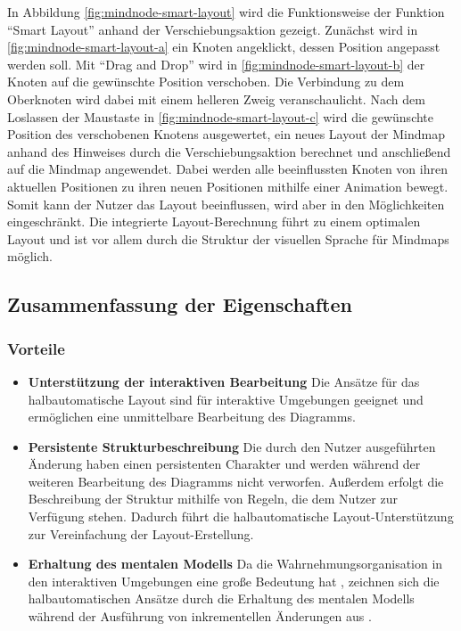 In Abbildung \ref{fig:mindnode-smart-layout} wird die Funktionsweise der Funktion \enquote{Smart Layout} anhand der Verschiebungsaktion gezeigt. Zunächst wird in \ref{fig:mindnode-smart-layout-a} ein Knoten angeklickt, dessen Position angepasst werden soll. Mit \enquote{Drag and Drop} wird in \ref{fig:mindnode-smart-layout-b} der Knoten auf die gewünschte Position verschoben. Die Verbindung zu dem Oberknoten wird dabei mit einem helleren Zweig veranschaulicht. Nach dem Loslassen der Maustaste in \ref{fig:mindnode-smart-layout-c} wird die gewünschte Position des verschobenen Knotens ausgewertet, ein neues Layout der Mindmap anhand des Hinweises durch die Verschiebungsaktion berechnet und anschließend auf die Mindmap angewendet. Dabei werden alle beeinflussten Knoten von ihren aktuellen Positionen zu ihren neuen Positionen mithilfe einer Animation bewegt. Somit kann der Nutzer das Layout beeinflussen, wird aber in den Möglichkeiten eingeschränkt. Die integrierte Layout-Berechnung führt zu einem optimalen Layout und ist vor allem durch die Struktur der visuellen Sprache für Mindmaps möglich.


\subsection{Zusammenfassung der Eigenschaften}

\subsubsection{Vorteile}

\begin{itemize}

\item
\textbf{Unterstützung der interaktiven Bearbeitung}
Die Ansätze für das halbautomatische Layout sind für interaktive Umgebungen geeignet und ermöglichen eine unmittelbare Bearbeitung des Diagramms.

\item
\textbf{Persistente Strukturbeschreibung}
Die durch den Nutzer ausgeführten Änderung haben einen persistenten Charakter und werden während der weiteren Bearbeitung des Diagramms nicht verworfen. Außerdem erfolgt die Beschreibung der Struktur mithilfe von Regeln, die dem Nutzer zur Verfügung stehen. Dadurch führt die halbautomatische Layout-Unterstützung zur Vereinfachung der Layout-Erstellung.

\item
\textbf{Erhaltung des mentalen Modells}
Da die Wahrnehmungsorganisation in den interaktiven Umgebungen eine große Bedeutung hat \cite{ShieberKosak93Automating, Maier12A-Pattern-based}, zeichnen sich die halbautomatischen Ansätze durch die Erhaltung des mentalen Modells während der Ausführung von inkrementellen Änderungen aus \cite{GladischSchumann14Semi-Automatic}.

\end{itemize}

